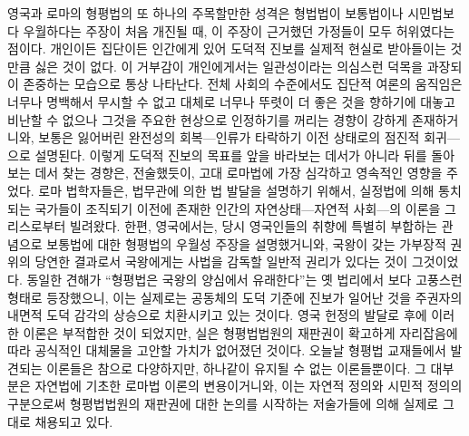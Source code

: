 영국과 로마의 형평법의 또 하나의 주목할만한 성격은
형법법이 보통법이나 시민법보다 우월하다는 주장이 처음
개진될 때, 이 주장이 근거했던 가정들이 모두 허위였다는 점이다.
개인이든 집단이든 인간에게 있어 도덕적 진보를 실제적 현실로
받아들이는 것만큼 싫은 것이 없다.
이 거부감이 개인에게서는 일관성이라는 의심스런 덕목을 과장되이 존중하는
모습으로 통상 나타난다.
전체 사회의 수준에서도 집단적 여론의 움직임은 너무나 명백해서 무시할 수 없고
대체로 너무나 뚜렷이 더 좋은 것을 향하기에 대놓고 비난할 수 없으나
그것을 주요한 현상으로 인정하기를 꺼리는 경향이 강하게 존재하거니와,
보통은 잃어버린 완전성의 회복---인류가 타락하기 이전 상태로의 점진적
회귀---으로 설명된다.
이렇게 도덕적 진보의 목표를 앞을 바라보는 데서가 아니라
뒤를 돌아보는 데서 찾는 경향은, 전술했듯이,
고대 로마법에 가장 심각하고 영속적인 영향을 주었다.
로마 법학자들은, 법무관에 의한 법 발달을 설명하기 위해서,
실정법에 의해 통치되는 국가들이 조직되기 이전에 존재한
인간의 자연상태---자연적 사회---의 이론을 그리스로부터 빌려왔다.
한편, 영국에서는, 당시 영국인들의 취향에 특별히 부합하는 관념으로
보통법에 대한 형평법의 우월성 주장을 설명했거니와,
국왕이 갖는 가부장적 권위의 당연한 결과로서 국왕에게는
사법을 감독할 일반적 권리가 있다는 것이 그것이었다.
동일한 견해가
``형평법은 국왕의 양심에서 유래한다''는
옛 법리에서
보다 고풍스런 형태로
등장했으니, 이는
실제로는 공동체의 도덕 기준에 진보가 일어난 것을
주권자의 내면적 도덕 감각의 상승으로 치환시키고 있는 것이다.
영국 헌정의 발달로 후에 이러한 이론은 부적합한 것이 되었지만,
실은 형평법법원의 재판권이 확고하게 자리잡음에 따라 공식적인 대체물을
고안할 가치가 없어졌던 것이다.
오늘날 형평법 교재들에서 발견되는 이론들은 참으로 다양하지만,
하나같이 유지될 수 없는 이론들뿐이다.
그 대부분은 자연법에 기초한 로마법 이론의 변용이거니와,
이는
자연적 정의와 시민적 정의의 구분으로써
형평법법원의 재판권에 대한 논의를 시작하는
저술가들에 의해
실제로 그대로
채용되고 있다.

